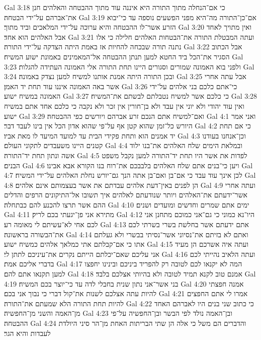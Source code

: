 Gal 3:18  כי אם־הנחלה מתוך התורה היא איננה עוד מתוך ההבטחה והאלהים חנן את־אברהם על־ידי הבטחה׃
Gal 3:19  אם־כן־התורה מה־היא מפני הפשעים נוספה עד כי־יבוא הזרע אשר־לו ההבטחה והיא ערוכה על־ידי המלאכים וביד מתוך׃
Gal 3:20  ואין מתויך לאחד אבל האלהים הוא אחד׃
Gal 3:21  ועתה המבטלת התורה את־הבטחות האלהים חלילה כי אלו נתנה תורה שבכחה להחיות אז באמת היתה הצדקה על־ידי התורה׃
Gal 3:22  אבל הכתוב הסגיר את־הכל ביד החטא למען תנתן ההבטחה אל־המאמינים באמונת ישוע המשיח׃
Gal 3:23  ולפני בוא האמונה שמורים וסגורים היינו תחת התורה אלי האמונה העתידה להגלות׃
Gal 3:24  ובכן התורה היתה אמנת אותנו למשיח למען נצדק באמונה׃
Gal 3:25  אבל עתה אחרי אשר באה האמונה איננו עוד תחת יד האמן׃
Gal 3:26  כי־אתם כלכם בני אלהים על־ידי האמונה במשיח ישוע׃
Gal 3:27  כי כלכם אשר למשיח נטבלתם לבשתם את־המשיח׃
Gal 3:28  ואין עוד יהודי ולא יוני אין עבד ולא בן־חורין אין זכר ולא נקבה כי כלכם אחד אתם במשיח ישוע׃
Gal 3:29  ואם־למשיח אתם הנכם זרע אברהם ויורשים כפי ההבטחה׃
Gal 4:1  ואני אמר היורש כל־זמן שהוא קטן אף על־פי שהוא אדון הכל אין בינו לעבד דבר׃
Gal 4:2  כי אם תחת יד אמנים הוא ותחת פקידי הבית עד למועד המיעד לו מאת אביו׃
Gal 4:3  וכן־אנחנו בעודנו קטנים היינו משעבדים לתקוני העולם׃
Gal 4:4  ובמלאת הימים שלח האלהים את־בנו ילוד אשה ונתון תחת יד־התורה׃
Gal 4:5  לפדות את אשר היו תחת יד־התורה למען נקבל משפט הבנים׃
Gal 4:6  ויען כי־בנים אתם שלח האלהים בלבבכם את־רוח בנו הקורא אבא אבינו׃
Gal 4:7  לכן אינך עוד עבד כי אם־בן ואם־בן אתה הנך גם־יורש נחלת האלהים על־ידי המשיח׃
Gal 4:8  הן לפנים באין־דעת אלהים עבדתם את אשר בעצמותם אינם אלהים׃
Gal 4:9  ועתה אחרי אשר־ידעתם את־האלהים ויותר שנודעתם לאלהים איך תשובו אל־התיקונים הרפים והדלים ההם אשר תרצו להכנע להם כבתחלה׃
Gal 4:10  ימים אתם שמרים וחדשים ומועדים ושנים׃
Gal 4:11  מתירא אני פן־יגעתי בכם לריק׃
Gal 4:12  היו־נא כמוני כי גם־אני כמוכם מתחנן אני לכם אחי לא־עשיתם לי מאומה רע׃
Gal 4:13  אתם ידעתם אשר בחלשת בשרי בשרתי לכם את־הבשורה בראשונה׃
Gal 4:14  ואתם לא בזיתם את־נסיוני אשר־נסיתי בבשרי ולא געלתם אתו כי אם־קבלתם אתי כמלאך אלהים כמשיח ישוע׃
Gal 4:15  ועתה איה אשרכם הן מעיד אני עליכם שאם־יכלתם הייתם נקרים את־עיניכם לתתן לי׃
Gal 4:16  ועתה הלאיב נהייתי לכם בדברי אליכם אמת׃
Gal 4:17  המה לא יקנאו לכם לטובה רק להפריד ביניכם ובינינו יחפצו למען תקנאו אתם להם׃
Gal 4:18  אמנם טוב לקנא תמיד לטובה ולא בהיותי אצלכם בלבד׃
Gal 4:19  בני אשר־אני נתון שנית בחבלי לדה עד כי־יוצר בכם המשיח׃
Gal 4:20  אמנה חפצתי להיות עתה אצלכם לשנות את־קול דברי כי נבוך אני בכם׃
Gal 4:21  אמרו לי אתם החפצים להיות תחת התורה הלא שמעתם את־התורה׃
Gal 4:22  כי כתוב שני בנים היו לאברהם האחד מן־האמה והשני מן־החפשיה׃
Gal 4:23  ובן־האמה נולד לפי הבשר ובן־החפשיה על־פי ההבטחה׃
Gal 4:24  והדברים הם משל כי אלה הן שתי הבריתות האחת מן־הר סיני היולדת לעבדות והיא הגר׃
